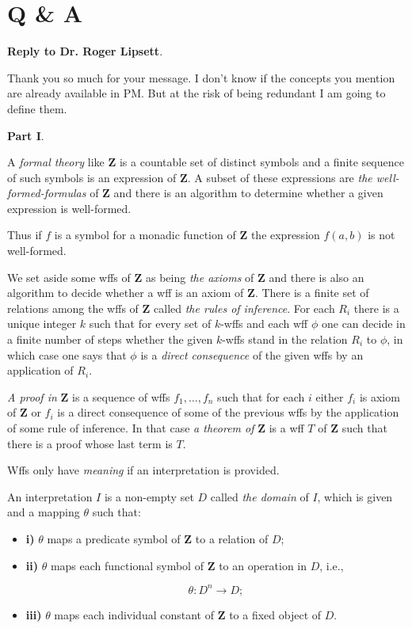 \documentclass[12pt]{article}
\begin{document}
\section{Q \& A}\normalsize

\textbf{Reply to Dr. Roger Lipsett}.

Thank you so much for your message. I don't know if the concepts you mention are already available in PM. But at the risk of being redundant I am going to define them.

\begin{large}
\textbf{Part I}.
\end{large}

A \emph{formal theory} like $\textbf{Z}$ is a countable set of distinct symbols and a finite sequence of such symbols is an expression of $\textbf{Z}$. A subset of these expressions are \emph{the well-formed-formulas} of $\textbf{Z}$ and there is an algorithm to determine whether a given expression is well-formed.

Thus if $f$ is a symbol for a monadic function of $\textbf{Z}$ the expression $f (a, b)$ is not well-formed.

We set aside some wffs of $\textbf{Z}$ as being \emph{the axioms} of $\textbf{Z}$ and there is also an algorithm to decide whether a wff is an axiom of $\textbf{Z}$. There is a finite set of relations among the wffs of $\textbf{Z}$ called \emph{the rules of inference}. For each $R_i$ there is a unique integer $k$ such that for every set of $k$-wffs and each wff $\phi$ one can decide in a finite number of steps whether the given $k$-wffs stand in the relation $R_i$ to $\phi$, in which case one says that $\phi$ is a \emph{direct consequence} of the given wffs by an application of $R_i$.

\emph{A proof in} $\textbf{Z}$ is a sequence of wffs $f_1, \ldots, f_n$ such that for each $i$ either $f_i$ is axiom of $\textbf{Z}$ or $f_i$ is a direct consequence of some of the previous wffs by the application of some rule of inference. In that case \emph{a theorem of} $\textbf{Z}$ is a wff $T$ of $\textbf{Z}$ such that there is a proof whose last term is $T$.

Wffs only have \emph{meaning} if an interpretation is provided.

An interpretation $I$ is a non-empty set $D$ called \emph{the domain} of $I$, which is given and a mapping $\theta$ such that:

\begin{itemize}
\item \textbf{i)} $\theta$ maps a predicate symbol of $\textbf{Z}$ to a relation of $D$;

\item \textbf{ii)} $\theta$ maps each functional symbol of $\textbf{Z}$ to an operation in $D$, i.e.,

$$\theta: D^n \rightarrow D;$$

\item \textbf{iii)} $\theta$ maps each individual constant of $\textbf{Z}$ to a fixed object of $D$.
\end{itemize}
\end{document}
